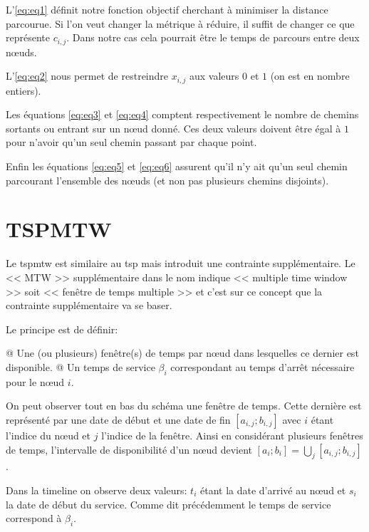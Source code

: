 \documentclass[final]{polytech/polytech}
\begin{document}
		L'\autoref{eq:eq1} définit notre fonction objectif cherchant à minimiser la distance parcourue.
		Si l'on veut changer la métrique à réduire, il suffit de changer ce que représente $c_{i,j}$.
		Dans notre cas cela pourrait être le temps de parcours entre deux n\oe uds.
		
		L'\autoref{eq:eq2} nous permet de restreindre $x_{i,j}$ aux valeurs $0$ et $1$ (on est en nombre entiers).
		
		Les équations \autoref{eq:eq3} et \autoref{eq:eq4} comptent respectivement le nombre de chemins sortants ou entrant sur un n\oe ud donné.
		Ces deux valeurs doivent être égal à $1$ pour n'avoir qu'un seul chemin passant par chaque point.
		
		Enfin les équations \autoref{eq:eq5} et \autoref{eq:eq6} assurent qu'il n'y ait qu'un seul chemin parcourant l'ensemble des n\oe uds (et non pas plusieurs chemins disjoints).
		
	
	\section{TSPMTW}
		Le \gls{tspmtw} est similaire au \gls{tsp} mais introduit une contrainte supplémentaire.
		Le << MTW >> supplémentaire dans le nom indique << multiple time window >> soit << fenêtre de temps multiple >> et c'est sur ce concept que la contrainte supplémentaire va se baser.
		
		Le principe est de définir:
		\begin{easylist}
			@ Une (ou plusieurs) fenêtre(s) de temps par n\oe ud dans lesquelles ce dernier est disponible.
			@ Un temps de service $\beta_i$ correspondant au temps d'arrêt nécessaire pour le n\oe ud $i$.
		\end{easylist}

		 
		On peut observer tout en bas du schéma une fenêtre de temps.
		Cette dernière est représenté par une date de début et une date de fin $\left[ a_{i,j}; b_{i,j}\right]$ avec $i$ étant l'indice du n\oe ud et $j$ l'indice de la fenêtre.
		Ainsi en considérant plusieurs fenêtres de temps, l'intervalle de disponibilité d'un n\oe ud devient $\left[ a_i;b_i\right] =\bigcup_j\left[ a_{i,j}; b_{i,j}\right]$.
		
		Dans la timeline on observe deux valeurs: $t_i$ étant la date d'arrivé au n\oe ud et $s_i$ la date de début du service.
		Comme dit précédemment le temps de service correspond à $\beta_i$.
		
\end{document}
